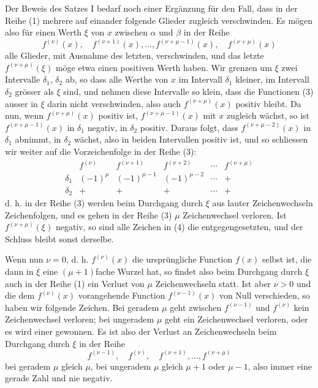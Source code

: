 \documentclass[11pt]{article}
\begin{document}
Der Beweis des Satzes I bedarf noch einer Ergänzung für den Fall, dass in der Reihe (1) mehrere auf einander folgende Glieder zugleich verschwinden. Es mögen also für einen Werth $\xi$ von $x$ zwischen $\alpha$ und $\beta$ in der Reihe
\begin{equation}
        f^{(\nu)}(x),\quad f^{(\nu+1)}(x),\ldots,
        f^{(\nu+\mu-1)}(x),\quad f^{(\nu+\mu)}(x)
\tag{3}
\end{equation}
alle Glieder, mit Ausnahme des letzten, verschwinden, und das letzte $f^{(\nu+\mu)}(\xi)$ möge etwa einen positiven Werth haben. Wir grenzen um $\xi$ zwei Intervalle $\delta_1$, $\delta_2$ ab, so dass alle Werthe von $x$ im Intervall $\delta_1$ kleiner, im Intervall $\delta_2$ grösser als $\xi$ sind, und nehmen diese Intervalle so klein, dass die Functionen (3) ausser in $\xi$ darin nicht verschwinden, also auch $f^{(\nu+\mu)}(x)$ positiv bleibt. Da nun, wenn $f^{(\nu+\mu)}(x)$ positiv ist, $f^{(\nu+\mu-1)}(x)$ mit $x$ zugleich wächst, so ist $f^{(\nu+\mu-1)}(x)$ in $\delta_1$ negativ, in $\delta_2$ positiv. Daraus folgt, dass $f^{(\nu+\mu-2)}(x)$ in $\delta_1$ abnimmt, in $\delta_2$ wächst, also in beiden Intervallen positiv ist, und so schliessen wir weiter auf die Vorzeichenfolge in der Reihe (3):
\[
\begin{array}{c|ccccc}
& f^{(\nu)} & f^{(\nu+1)} & f^{(\nu+2)} & \cdots & f^{(\nu+\mu)}\\ \hline
\delta_1&(-1)^\mu&(-1)^{\mu-1}&(-1)^{\mu-2}&\cdots&+\\
\delta_2&+&+&+&\cdots&+
\end{array}
\tag{4}
\]
d. h. in der Reihe (3) werden beim Durchgang durch $\xi$ aus lauter Zeichenwechseln Zeichenfolgen, und es gehen in der Reihe (3) $\mu$ Zeichenwechsel verloren. Ist $f^{(\nu+\mu)}(\xi)$ negativ, so sind alle Zeichen in (4) die entgegengesetzten, und der Schluss bleibt sonst derselbe.

Wenn nun $\nu=0$, d. h. $f^{(\nu)}(x)$ die ursprüngliche Function $f(x)$ selbst ist, die dann in $\xi$ eine $(\mu+1)$fache Wurzel hat, so findet also beim Durchgang durch $\xi$ auch in der Reihe (1) ein Verlust von $\mu$ Zeichenwechseln statt. Ist aber $\nu>0$ und die dem $f^{(\nu)}(x)$ vorangehende Function $f^{(\nu-1)}(x)$ von Null verschieden, so haben wir folgende Zeichen. Bei geradem $\mu$ geht zwischen $f^{(\nu-1)}$ und $f^{(\nu)}$ kein Zeichenwechsel verloren; bei ungeradem $\mu$ geht ein Zeichenwechsel verloren, oder es wird einer gewonnen. Es ist also der Verlust an Zeichenwechseln beim Durchgang durch $\xi$ in der Reihe
\begin{equation}
        f^{(\nu-1)},\quad f^{(\nu)},\quad f^{(\nu+1)},\ldots,
        f^{(\nu+\mu)}
\tag{5}
\end{equation}
bei geradem $\mu$ gleich $\mu$, bei ungeradem $\mu$ gleich $\mu+1$ oder $\mu-1$, also immer eine gerade Zahl und nie negativ.
\end{document}
